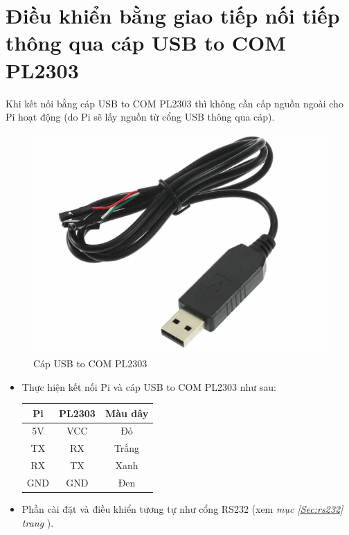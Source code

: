 \section{Điều khiển bằng giao tiếp nối tiếp thông qua cáp USB to COM PL2303}
Khi kết nối bằng cáp USB to COM PL2303 thì không cần cấp nguồn ngoài cho Pi hoạt động (do Pi sẽ lấy nguồn từ cổng USB thông qua cáp).
\begin{figure}[!h]
\begin{center}
\includegraphics[scale=.3]{remote/images/cap-usb-to-com-pl2303}
\end{center}
\caption{Cáp USB to COM PL2303}
\end{figure}
\begin{itemize}
\item Thực hiện kết nối Pi và cáp USB to COM PL2303 như sau:
\begin{center}
\begin{tabular}{c|c|c}
Pi & PL2303 & Màu dây\\ \hline
5V & VCC & Đỏ\\
TX & RX & Trắng\\ 
RX & TX & Xanh\\
GND & GND & Đen
\end{tabular}
\end{center}
\item Phần cài đặt và điều khiển tương tự như cổng RS232 (xem \textit{mục \ref{Sec:rs232} trang \pageref{Sec:rs232}}).
\end{itemize}
